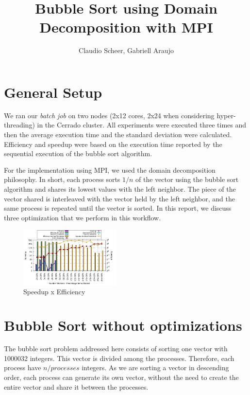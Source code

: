 \documentclass[10pt,twocolumn]{article}
\begin{document}
\title{\vspace{-1.5cm}Bubble Sort using Domain Decomposition with MPI}
\author[]{Claudio Scheer, Gabriell Araujo}
\date{}

\maketitle


\section*{General Setup}

We ran our \textit{batch job} on two nodes (2x12 cores, 2x24 when considering hyper-threading) in the Cerrado cluster. All experiments were executed three times and then the average execution time and the standard deviation were calculated. Efficiency and speedup were based on the execution time reported by the sequential execution of the bubble sort algorithm.

For the implementation using MPI, we used the domain decomposition philosophy. In short, each process sorts $1/n$ of the vector using the bubble sort algorithm and shares its lowest values with the left neighbor. The piece of the vector shared is interleaved with the vector held by the left neighbor, and the same process is repeated until the vector is sorted. In this report, we discuss three optimization that we perform in this workflow.

\begin{figure}[ht]
	\centering
	\includegraphics[width=0.45\textwidth]{../logs/scripts/bubble-sort-speedup-efficiency.pdf}
	\caption{Speedup x Efficiency}
	\label{fig:bubble-sort-speedup-efficiency}
\end{figure}


\section*{Bubble Sort without optimizations}

The bubble sort problem addressed here consists of sorting one vector with 1000032 integers. This vector is divided among the processes. Therefore, each process have $n/processes$ integers. As we are sorting a vector in descending order, each process can generate its own vector, without the need to create the entire vector and share it between the processes.
\end{document}
